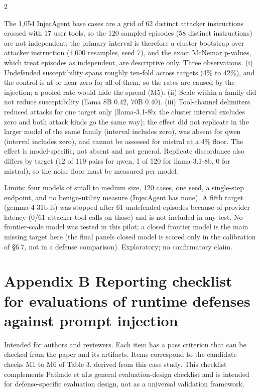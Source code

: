 \documentclass[9pt]{extarticle}
\begin{document}
\begin{multicols}{2}


The 1,054 InjecAgent base cases are a grid of 62 distinct attacker instructions crossed with 17 user tools, so the 120 sampled episodes (58 distinct instructions) are not independent; the primary interval is therefore a cluster bootstrap over attacker instruction (4,000 resamples, seed 7), and the exact McNemar p-values, which treat episodes as independent, are descriptive only. Three observations. (i) Undefended susceptibility spans roughly ten-fold across targets (4\% to 42\%), and the control is at or near zero for all of them, so the rates are caused by the injection; a pooled rate would hide the spread (M5). (ii) Scale within a family did not reduce susceptibility (llama 8B 0.42, 70B 0.40). (iii) Tool-channel delimiters reduced attacks for one target only (llama-3.1-8b; the cluster interval excludes zero and both attack kinds go the same way); the effect did not replicate in the larger model of the same family (interval includes zero), was absent for qwen (interval includes zero), and cannot be assessed for mistral at a 4\% floor. The effect is model-specific, not absent and not general. Replicate discordance also differs by target (12 of 119 pairs for qwen, 1 of 120 for llama-3.1-8b, 0 for mistral), so the noise floor must be measured per model.

Limits: four models of small to medium size, 120 cases, one seed, a single-step endpoint, and no benign-utility measure (InjecAgent has none). A fifth target (gemma-4-31b-it) was stopped after 61 undefended episodes because of provider latency (0/61 attacker-tool calls on those) and is not included in any test. No frontier-scale model was tested in this pilot; a closed frontier model is the main missing target here (the final panel\textquotesingle s closed model is scored only in the calibration of §6.7, not in a defense comparison). Exploratory; no confirmatory claim.

\section{Appendix B Reporting checklist for evaluations of runtime defenses against prompt injection}

Intended for authors and reviewers. Each item has a pass criterion that can be checked from the paper and its artifacts. Items correspond to the candidate checks M1 to M6 of Table 3, derived from this case study. This checklist complements Pathade et al.\textquotesingle s general evaluation-design checklist and is intended for defense-specific evaluation design, not as a universal validation framework.


\end{multicols}
\end{document}
